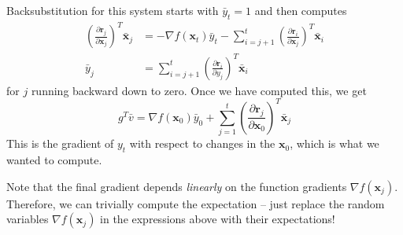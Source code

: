 \documentclass{article}
\newcommand{\bfx}{\mathbf{x}}
\newcommand{\bfr}{\mathbf{r}}
\begin{document}
Backsubstitution for this system starts with $\bar{y}_t = 1$ and
then computes
\begin{align*}
  \left( \frac{\partial \bfr_j}{\partial \bfx_j} \right)^T \bar{\bfx}_j
  &= -\nabla f(\bfx_t) \bar{y}_t - \sum_{i=j+1}^t
      \left( \frac{\partial \bfr_i}{\partial \bfx_j} \right)^T
      \bar{\bfx}_i \\
  \bar{y}_j &= \sum_{i=j+1}^t \left( \frac{\partial \bfr_i}{\partial y_j}
  \right)^T \bar{\bfx}_i
\end{align*}
for $j$ running backward down to zero.  Once we have computed this,
we get
\[
g^T \bar{v} = \nabla f(\bfx_0) \bar{y}_0 +
\sum_{j=1}^t
\left( \frac{\partial \bfr_j}{\partial \bfx_0} \right)^T \bar{\bfx}_j
\]
This is the gradient of $y_t$ with respect to changes in the $\bfx_0$,
which is what we wanted to compute.

Note that the final gradient depends {\em linearly} on the function
gradients $\nabla f(\bfx_j)$.  Therefore, we can trivially compute the
expectation -- just replace the random variables $\nabla f(\bfx_j)$
in the expressions above with their expectations!
\end{document}

